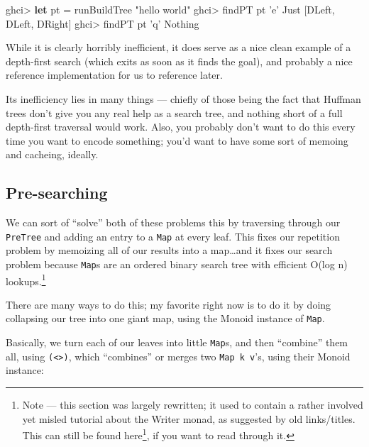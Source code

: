 \documentclass[]{article}
\newenvironment{Shaded}{}{}
\newcommand{\KeywordTok}[1]{\textcolor[rgb]{0.00,0.44,0.13}{\textbf{{#1}}}}
\newcommand{\DataTypeTok}[1]{\textcolor[rgb]{0.56,0.13,0.00}{{#1}}}
\newcommand{\CharTok}[1]{\textcolor[rgb]{0.25,0.44,0.63}{{#1}}}
\newcommand{\StringTok}[1]{\textcolor[rgb]{0.25,0.44,0.63}{{#1}}}
\newcommand{\FunctionTok}[1]{\textcolor[rgb]{0.02,0.16,0.49}{{#1}}}
\newcommand{\NormalTok}[1]{{#1}}
\renewcommand{\href}[2]{#2\footnote{\url{#1}}}
\begin{document}
\begin{Shaded}
\begin{Highlighting}[]
\NormalTok{ghci}\FunctionTok{>} \KeywordTok{let} \NormalTok{pt }\FunctionTok{=} \NormalTok{runBuildTree }\StringTok{"hello world"}
\NormalTok{ghci}\FunctionTok{>} \NormalTok{findPT pt }\CharTok{'e'}
\DataTypeTok{Just} \NormalTok{[}\DataTypeTok{DLeft}\NormalTok{, }\DataTypeTok{DLeft}\NormalTok{, }\DataTypeTok{DRight}\NormalTok{]}
\NormalTok{ghci}\FunctionTok{>} \NormalTok{findPT pt }\CharTok{'q'}
\DataTypeTok{Nothing}
\end{Highlighting}
\end{Shaded}

While it is clearly horribly inefficient, it does serve as a nice clean
example of a depth-first search (which exits as soon as it finds the
goal), and probably a nice reference implementation for us to reference
later.

Its inefficiency lies in many things --- chiefly of those being the fact
that Huffman trees don't give you any real help as a search tree, and
nothing short of a full depth-first traversal would work. Also, you
probably don't want to do this every time you want to encode something;
you'd want to have some sort of memoing and cacheing, ideally.

\subsection{Pre-searching}\label{pre-searching}

We can sort of ``solve'' both of these problems this by traversing
through our \texttt{PreTree} and adding an entry to a \texttt{Map} at
every leaf. This fixes our repetition problem by memoizing all of our
results into a map\ldots{}and it fixes our search problem because
\texttt{Map}s are an ordered binary search tree with efficient O(log n)
lookups.\footnote{Note --- this section was largely rewritten; it used
  to contain a rather involved yet misled tutorial about the Writer
  monad, as suggested by old links/titles. This can
  \href{https://github.com/mstksg/inCode/blob/master/copy/entries/.huffman-2-writer.md}{still
  be found here}, if you want to read through it.}

There are many ways to do this; my favorite right now is to do it by
doing collapsing our tree into one giant map, using the Monoid instance
of \texttt{Map}.

Basically, we turn each of our leaves into little \texttt{Map}s, and
then ``combine'' them all, using \texttt{(\textless{}\textgreater{})},
which ``combines'' or merges two \texttt{Map\ k\ v}'s, using their
Monoid instance:
\end{document}
